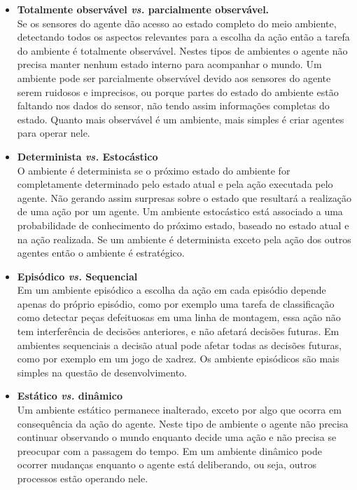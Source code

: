 \begin{itemize}
\item \textbf{Totalmente observável \textit{vs.} parcialmente observável.} \\
Se os sensores do agente dão acesso ao estado completo do meio ambiente, detectando todos os aspectos relevantes para a escolha da ação então a tarefa do ambiente é totalmente observável. Nestes tipos de ambientes o agente não precisa manter nenhum estado interno para acompanhar o mundo. Um ambiente pode ser parcialmente observável devido aos sensores do agente serem ruidosos e imprecisos, ou porque partes do estado do ambiente estão faltando nos dados do sensor, não tendo assim informações completas do estado. Quanto mais observável é um ambiente, mais simples é criar agentes para operar nele.

\item \textbf{Determinista \textit{vs.} Estocástico}\\
O ambiente é determinista se o próximo estado do ambiente for completamente determinado pelo estado atual e pela ação executada pelo agente. Não gerando assim surpresas sobre o estado que resultará a realização de uma ação por um agente. Um ambiente estocástico está associado a uma probabilidade de conhecimento do próximo estado, baseado no estado atual e na ação realizada. Se um ambiente é determinista exceto pela ação dos outros agentes então o ambiente é estratégico.

\item \textbf{Episódico \textit{vs.} Sequencial} \\
Em um ambiente episódico a escolha da ação em cada episódio depende apenas do próprio episódio, como por exemplo uma tarefa de classificação como detectar peças defeituosas em uma linha de montagem, essa ação não tem interferência de decisões anteriores, e não afetará decisões futuras. Em ambientes sequenciais a decisão atual pode afetar todas as decisões futuras, como por exemplo em um jogo de xadrez. Os ambiente episódicos são mais simples na questão de desenvolvimento.

\item \textbf{Estático \textit{vs.} dinâmico} \\
Um ambiente estático permanece inalterado, exceto por algo que ocorra em consequência da ação do agente. Neste tipo de ambiente o agente não precisa continuar observando o mundo enquanto decide uma ação e não precisa se preocupar com a passagem do tempo. Em um ambiente dinâmico pode ocorrer mudanças enquanto o agente está deliberando, ou seja, outros processos estão operando nele.


\end{itemize}
